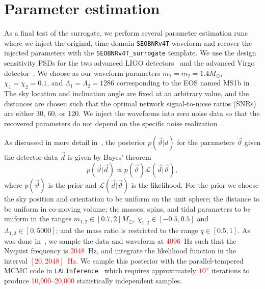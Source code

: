 \documentclass[prd,aps,letter,twocolumn,floatfix,notitlepage,nofootinbib]{revtex4-1}
\newcommand{\red}[1]{\textcolor{red}{#1}}
\begin{document}
\section{Parameter estimation}
\label{sec:pe}


As a final test of the surrogate, we perform several parameter estimation runs where we inject the original, time-domain \texttt{SEOBNRv4T} waveform and recover the injected parameters with the \texttt{SEOBNRv4T\_surrogate} template. We use the design sensitivity PSDs for the two advanced LIGO detectors~\cite{Aasi:2013wya} and the advanced Virgo detector~\cite{virgoPSD}. We choose as our waveform parameters $m_1=m_2=1.4M_\odot$, $\chi_1=\chi_2=0.1$, and $\Lambda_1=\Lambda_2=1286$ corresponding to the EOS named MS1b in~\cite{ReadLackey2009}. The sky location and inclination angle are fixed at an arbitrary value, and the distances are chosen such that the optimal network signal-to-noise ratios (SNRs) are either 30, 60, or 120. We inject the waveforms into zero noise data so that the recovered parameters do not depend on the specific noise realization~\cite{NissankeHolzHughes2010}.

As discussed in more detail in~\cite{BNSPE}, the posterior $p(\vec\vartheta | d)$ for the parameters $\vec\vartheta$ given the detector data $\vec d$ is given by Bayes' theorem
\begin{equation}
p(\vec\vartheta | \vec d) \propto p(\vec\vartheta) \mathcal{L}(\vec d | \vec\vartheta),
\end{equation}
where $p(\vec\vartheta)$ is the prior and $\mathcal{L}(\vec d | \vec\vartheta)$ is the likelihood. 
For the prior we choose the sky position and orientation to be uniform on the unit sphere; the distance to be uniform in co-moving volume; the masses, spins, and tidal parameters to be uniform in the ranges $m_{1, 2} \in [0.7, 2]M_\odot$, $\chi_{1,2} \in [-0.5, 0.5]$ and $\Lambda_{1,2} \in [0, 5000]$; and the mass ratio is restricted to the range $q\in[0.5, 1]$. 
As was done in~\cite{BNSPE}, we sample the data and waveform at \red{4096}~Hz such that the Nyquist frequency is \red{2048}~Hz, and integrate the likelihood function in the interval \red{$[20, 2048]$~Hz}. We sample this posterior with the parallel-tempered MCMC code in \texttt{LALInference}~\cite{lal} which requires approximately \red{$10^x$} iterations to produce \red{10,000--20,000} statistically independent samples. 
\end{document}
